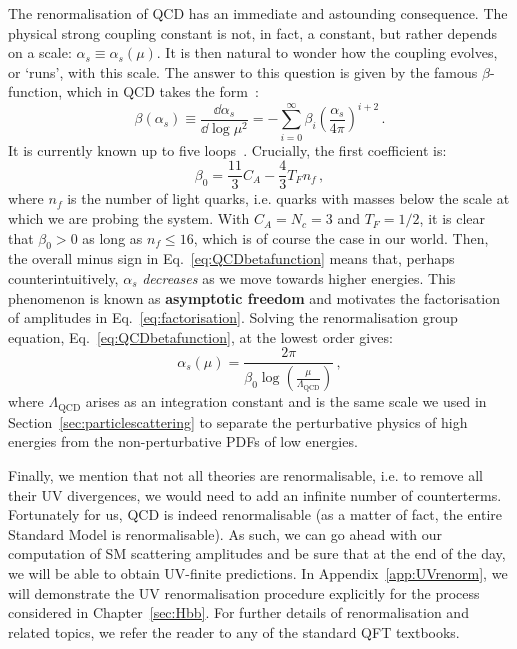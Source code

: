 \documentclass[main.tex]{subfiles}
\begin{document}
The renormalisation of QCD has an immediate and astounding consequence. The physical strong coupling constant is not, in fact, a constant, but rather depends on a scale: $\alpha_s \equiv \alpha_s(\mu)$. 
It is then natural to wonder how the coupling evolves, or `runs', with this scale. The answer to this question is given by the famous $\beta$-function, which in QCD takes the form~\cite{PhysRevD.2.1541, Symanzik:1970rt}:
\begin{equation} \label{eq:QCDbetafunction}
    \beta(\alpha_s) \equiv \frac{\dd \alpha_s}{\dd \log \mu^2} = - \sum_{i=0}^\infty \beta_i \left (\frac{\alpha_s}{4\pi} \right)^{i+2}\,.
\end{equation}
It is currently known up to five loops~\cite{Baikov:2016tgj}. Crucially, the first coefficient is:
\begin{equation}
    \beta_0 = \frac{11}{3} C_A - \frac{4}{3} T_F n_f\,,
\end{equation}
where $n_f$ is the number of light quarks, i.e. quarks with masses below the scale at which we are probing the system. With $C_A = N_c = 3$ and $T_F = 1/2$, it is clear that $\beta_0>0$ as long as $n_f\le 16$, which is of course the case in our world. Then, the overall minus sign in Eq.~\ref{eq:QCDbetafunction} means that, perhaps counterintuitively, $\alpha_s$ \textit{decreases} as we move towards higher energies. This phenomenon is known as \textbf{asymptotic freedom} and motivates the factorisation of amplitudes in Eq.~\ref{eq:factorisation}. Solving the renormalisation group equation, Eq.~\ref{eq:QCDbetafunction}, at the lowest order gives:
\begin{equation}
    \alpha_s(\mu) = \frac{2\pi}{\beta_0 \log \left(\frac{\mu}{\Lambda_\text{QCD}}\right)}\,,
\end{equation}
where $\Lambda_\text{QCD}$ arises as an integration constant and is the same scale we used in Section~\ref{sec:particlescattering} to separate the perturbative physics of high energies from the non-perturbative PDFs of low energies. 

Finally, we mention that not all theories are renormalisable, i.e. to remove all their UV divergences, we would need to add an infinite number of counterterms. Fortunately for us, QCD is indeed renormalisable (as a matter of fact, the entire Standard Model is renormalisable). As such, we can go ahead with our computation of SM scattering amplitudes and be sure that at the end of the day, we will be able to obtain UV-finite predictions. In Appendix~\ref{app:UVrenorm}, we will demonstrate the UV renormalisation procedure explicitly for the process considered in Chapter~\ref{sec:Hbb}. For further details of renormalisation and related topics, we refer the reader to any of the standard QFT textbooks.
\end{document}
